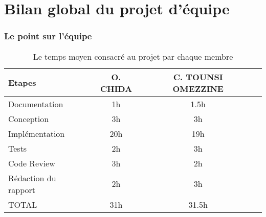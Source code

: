 \documentclass[12pt]{article}
\begin{document}
\section*{Bilan global du projet d'équipe} 

    \subsubsection*{Le point sur l'équipe}
    \begin{table}[!ht]
            \begin{center}
                \begin{tabular}{|l|c|c|c|}
                    \hline
                    Etapes & O. CHIDA & C. TOUNSI OMEZZINE \\
                    \hline
                    Documentation & 1h & 1.5h \\
                    \hline
                    Conception & 3h  & 3h \\
                    \hline
                    Implémentation & 20h & 19h \\ 
                    \hline 
                    Tests & 2h & 3h \\ 
                    \hline
                    Code Review & 3h & 2h \\
                    \hline
                    Rédaction du rapport & 2h  & 3h \\
                    \hline
                    \hline
                    TOTAL & 31h & 31.5h \\ 
                    \hline
                \end{tabular}
            \end{center}
            \caption{Le temps moyen consacré au projet par chaque membre}
            \label{tab:times}
        \end{table}
\end{document}
